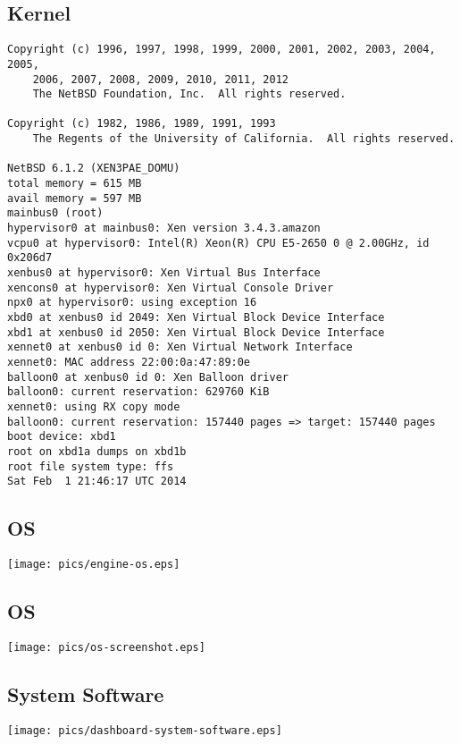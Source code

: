 \documentclass[xga]{xdvislides}
\begin{document}
\subsection{Kernel}
\small
\begin{verbatim}
Copyright (c) 1996, 1997, 1998, 1999, 2000, 2001, 2002, 2003, 2004, 2005,
    2006, 2007, 2008, 2009, 2010, 2011, 2012
    The NetBSD Foundation, Inc.  All rights reserved.

Copyright (c) 1982, 1986, 1989, 1991, 1993
    The Regents of the University of California.  All rights reserved.

NetBSD 6.1.2 (XEN3PAE_DOMU)
total memory = 615 MB
avail memory = 597 MB
mainbus0 (root)
hypervisor0 at mainbus0: Xen version 3.4.3.amazon
vcpu0 at hypervisor0: Intel(R) Xeon(R) CPU E5-2650 0 @ 2.00GHz, id 0x206d7
xenbus0 at hypervisor0: Xen Virtual Bus Interface
xencons0 at hypervisor0: Xen Virtual Console Driver
npx0 at hypervisor0: using exception 16
xbd0 at xenbus0 id 2049: Xen Virtual Block Device Interface
xbd1 at xenbus0 id 2050: Xen Virtual Block Device Interface
xennet0 at xenbus0 id 0: Xen Virtual Network Interface
xennet0: MAC address 22:00:0a:47:89:0e
balloon0 at xenbus0 id 0: Xen Balloon driver
balloon0: current reservation: 629760 KiB
xennet0: using RX copy mode
balloon0: current reservation: 157440 pages => target: 157440 pages
boot device: xbd1
root on xbd1a dumps on xbd1b
root file system type: ffs
Sat Feb  1 21:46:17 UTC 2014
\end{verbatim}
\Normalsize

\subsection{OS}
\begin{center}
	\texttt{[image: pics/engine-os.eps]}
\end{center}

\subsection{OS}
\begin{center}
	\texttt{[image: pics/os-screenshot.eps]}
\end{center}

\subsection{System Software}
\begin{center}
	\texttt{[image: pics/dashboard-system-software.eps]}
\end{center}
\end{document}
